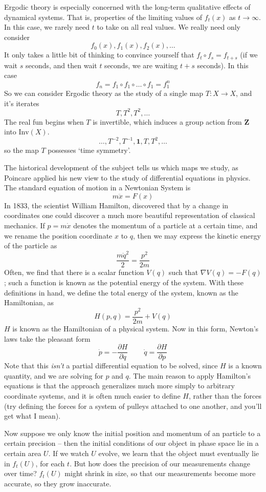 \documentclass{article}
\theoremstyle{plain}
\theoremstyle{definition}
\begin{document}
Ergodic theory is especially concerned with the long-term qualitative effects of dynamical systems. That is, properties of the limiting values of $f_t(x)$ as $t \to \infty$. In this case, we rarely need $t$ to take on all real values. We really need only consider
%
\[ f_0(x), f_1(x), f_2(x), \dots \]
%
It only takes a little bit of thinking to convince yourself that $f_t \circ f_s = f_{t+s}$ (if we wait $s$ seconds, and then wait $t$ seconds, we are waiting $t + s$ seconds). In this case
%
\[ f_n = f_1 \circ f_1 \circ \dots \circ f_1 = f_1^n \]
%
So we can consider Ergodic theory as the study of a single map $T:X \to X$, and it's iterates
%
\[ T, T^2, T^2, \dots \]
%
The real fun begins when $T$ is invertible, which induces a group action from $\mathbf{Z}$ into $\text{Inv}(X)$.
%
\[ \dots, T^{-2}, T^{-1}, \mathbf{1}, T, T^2, \dots \]
%
so the map $T$ possesses `time symmetry'.

The historical development of the subject tells us which maps we study, as Poincare applied his new view to the study of differential equations in physics. The standard equation of motion in a Newtonian System is
%
\[ m \ddot{x} = F(x) \]
%
In 1833, the scientist William Hamilton, discovered that by a change in coordinates one could discover a much more beautiful representation of classical mechanics. If $p = m \dot{x}$ denotes the momentum of a particle at a certain time, and we rename the position coordinate $x$ to $q$, then we may express the kinetic energy of the particle as
%
\[ \frac{m\dot{q}^2}{2} = \frac{p^2}{2m} \]
%
Often, we find that there is a scalar function $V(q)$ such that $\nabla V(q) = - F(q)$; such a function is known as the potential energy of the system. With these definitions in hand, we define the total energy of the system, known as the Hamiltonian, as
%
\[ H(p,q) = \frac{p^2}{2m} + V(q) \]
%
$H$ is known as the Hamiltonian of a physical system. Now in this form, Newton's laws take the pleasant form
%
\[ \dot{p} = - \frac{\partial H}{\partial q}\ \ \ \ \ \ \ \ \ \ \dot{q} = \frac{\partial H}{\partial p} \]
%
Note that this {\it isn't} a partial differential equation to be solved, since $H$ is a known quantity, and we are solving for $p$ and $q$. The main reason to apply Hamilton's equations is that the approach generalizes much more simply to arbitrary coordinate systems, and it is often much easier to define $H$, rather than the forces (try defining the forces for a system of pulleys attached to one another, and you'll get what I mean).

Now suppose we only know the initial position and momentum of an particle to a certain precision -- then the initial conditions of our object in phase space lie in a certain area $U$. If we watch $U$ evolve, we learn that the object must eventually lie in $f_t(U)$, for each $t$. But how does the precision of our measurements change over time? $f_t(U)$ might shrink in size, so that our measurements become more accurate, so they grow inaccurate.
\end{document}
